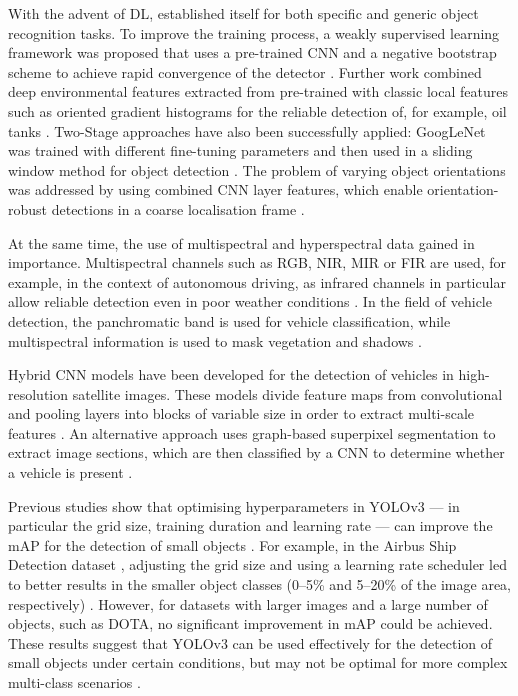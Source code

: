 With the advent of \Acrlong{DL},  established itself for both specific and generic object recognition tasks. To improve the training process, a weakly supervised learning framework was proposed that uses a pre-trained \acrshort{CNN} and a negative bootstrap scheme to achieve rapid convergence of the detector \cite{Zhou2016}. Further work combined deep environmental features extracted from pre-trained  with classic local features such as oriented gradient histograms \cite{Dalal2005} for the reliable detection of, for example, oil tanks \cite{Zhang2015}. Two-Stage approaches have also been successfully applied: GoogLeNet was trained with different fine-tuning parameters and then used in a sliding window method for object detection \cite{Sevo2016}. The problem of varying object orientations was addressed by using combined \acrshort{CNN} layer features, which enable orientation-robust detections in a coarse localisation frame \cite{Zhu2015}.

At the same time, the use of multispectral and hyperspectral data gained in importance. Multispectral channels such as \acrshort{RGB}, \acrshort{NIR}, \Acrfull{MIR} or \Acrfull{FIR} are used, for example, in the context of autonomous driving, as infrared channels in particular allow reliable detection even in poor weather conditions \cite{Takumi2017}. In the field of vehicle detection, the panchromatic band is used for vehicle classification, while multispectral information is used to mask vegetation and shadows \cite{Eikvil2009}.

Hybrid \acrshort{CNN} models have been developed for the detection of vehicles in high-resolution satellite images. These models divide feature maps from convolutional and pooling layers into blocks of variable size in order to extract multi-scale features \cite{XueyunChen2014}. An alternative approach uses graph-based superpixel segmentation to extract image sections, which are then classified by a \acrshort{CNN} to determine whether a vehicle is present \cite{Jiang2015}.

Previous studies show that optimising hyperparameters in \acrshort{YOLO}v3  — in particular the grid size, training duration and learning rate — can improve the \acrfull{mAP} for the detection of small objects \cite{Balzer2022}. For example, in the Airbus Ship Detection dataset \cite{Airbus_Ship_Det}, adjusting the grid size and using a learning rate scheduler led to better results in the smaller object classes (0–5\% and 5–20\% of the image area, respectively) \cite{Balzer2022}. However, for datasets with larger images and a large number of objects, such as \acrshort{DOTA}, no significant improvement in \acrshort{mAP} could be achieved. These results suggest that \acrshort{YOLO}v3 can be used effectively for the detection of small objects under certain conditions, but may not be optimal for more complex multi-class scenarios \cite{Balzer2022}.

